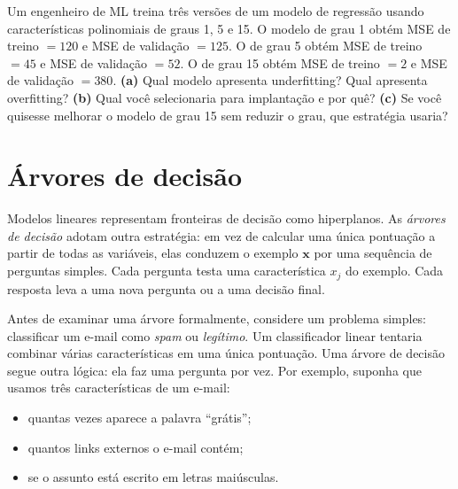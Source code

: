 \documentclass[12pt,a4paper]{article}
\begin{document}
\begin{perguntabox}
Um engenheiro de ML treina três versões de um modelo de regressão usando características polinomiais de graus 1, 5 e 15. O modelo de grau 1 obtém MSE de treino $= 120$ e MSE de validação $= 125$. O de grau 5 obtém MSE de treino $= 45$ e MSE de validação $= 52$. O de grau 15 obtém MSE de treino $= 2$ e MSE de validação $= 380$. \textbf{(a)} Qual modelo apresenta underfitting? Qual apresenta overfitting? \textbf{(b)} Qual você selecionaria para implantação e por quê? \textbf{(c)} Se você quisesse melhorar o modelo de grau 15 sem reduzir o grau, que estratégia usaria?
\end{perguntabox}

\section{Árvores de decisão}
\label{subsec:arvores}

Modelos lineares representam fronteiras de decisão como hiperplanos. 
As \emph{árvores de decisão} adotam outra estratégia: em vez de calcular uma única pontuação a partir de todas as variáveis, elas conduzem o exemplo $\mathbf{x}$ por uma sequência de perguntas simples. Cada pergunta testa uma característica $x_j$ do exemplo. Cada resposta leva a uma nova pergunta ou a uma decisão final.


Antes de examinar uma árvore formalmente, considere um problema simples: classificar um e-mail como \emph{spam} ou \emph{legítimo}. Um classificador linear tentaria combinar várias características em uma única pontuação. Uma árvore de decisão segue outra lógica: ela faz uma pergunta por vez. Por exemplo, suponha que usamos três características de um e-mail:

\begin{itemize}
    \item quantas vezes aparece a palavra ``grátis'';
    \item quantos links externos o e-mail contém;
    \item se o assunto está escrito em letras maiúsculas.
\end{itemize}
\end{document}
